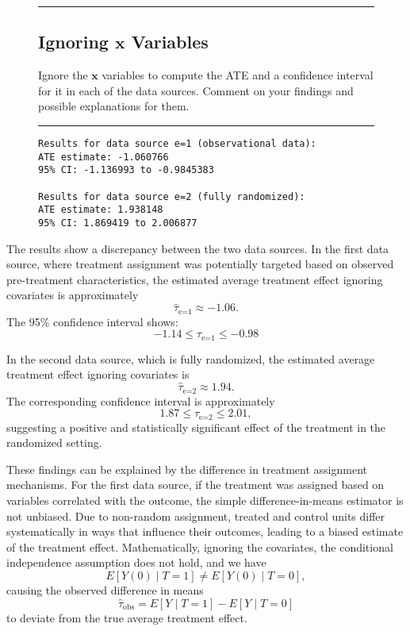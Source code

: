 \documentclass{article}
\newenvironment{colorparagraph}[1]{\par\color{#1}}{\par}
\begin{document}
\begin{figure}[H]
  \begin{colorparagraph}{questioncolor}
  \rule{\textwidth}{0.5pt}
  \label{q3a}
  \subsection{Ignoring \( \mathbf{x} \) Variables}

  Ignore the \( \mathbf{x} \) variables to compute the ATE and a confidence interval for it in each of the data sources. Comment on your findings and possible explanations for them.

  \rule{\textwidth}{0.5pt}
  \end{colorparagraph}
\end{figure}

\begin{figure}[H]
  \begin{lstlisting}[style=RstyleComment, caption=ATE and Confidence Interval Estimates Ignoring Covariates]
Results for data source e=1 (observational data):
ATE estimate: -1.060766 
95% CI: -1.136993 to -0.9845383 

Results for data source e=2 (fully randomized):
ATE estimate: 1.938148 
95% CI: 1.869419 to 2.006877 
  \end{lstlisting}
\end{figure}

The results show a discrepancy between the two data sources. In the first data source, where treatment assignment was potentially targeted based on observed pre-treatment characteristics, the estimated average treatment effect ignoring covariates is approximately 
\[
\widehat{\tau}_{\text{e=1}} \approx -1.06.
\]
The 95\% confidence interval shows:
\[
-1.14 \leq \tau_{\text{e=1}} \leq -0.98
\]

In the second data source, which is fully randomized, the estimated average treatment effect ignoring covariates is 
\[
\widehat{\tau}_{\text{e=2}} \approx 1.94.
\]
The corresponding confidence interval is approximately 
\[
1.87 \leq \tau_{\text{e=2}} \leq 2.01,
\]
suggesting a positive and statistically significant effect of the treatment in the randomized setting.

These findings can be explained by the difference in treatment assignment mechanisms. For the first data source, if the treatment was assigned based on variables correlated with the outcome, the simple difference-in-means estimator is not unbiased. Due to non-random assignment, treated and control units differ systematically in ways that influence their outcomes, leading to a biased estimate of the treatment effect. Mathematically, ignoring the covariates, the conditional independence assumption does not hold, and we have
\[
E[Y(0)\mid T=1] \neq E[Y(0)\mid T=0],
\]
causing the observed difference in means 
\[
\widehat{\tau}_{\text{obs}} = E[Y\mid T=1] - E[Y\mid T=0]
\]
to deviate from the true average treatment effect.
\end{document}
